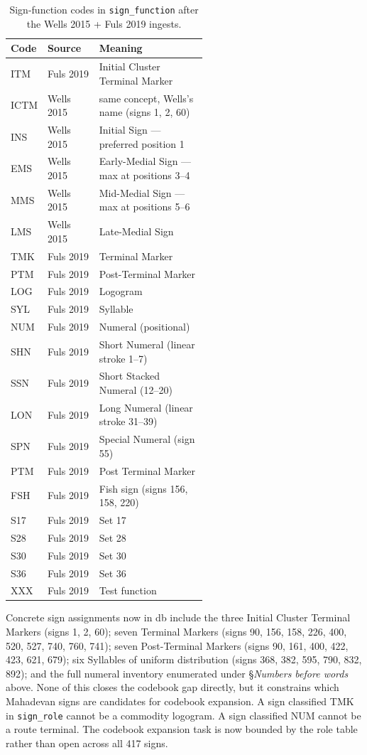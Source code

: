 \begin{longtable}{@{}llp{0.55\linewidth}@{}}
\caption{Sign-function codes in \texttt{sign\_function} after
the Wells 2015 + Fuls 2019 ingests.}
\label{tab:signfunctions}\\
\toprule
Code & Source & Meaning \\
\midrule
\endfirsthead
\bottomrule
\endlastfoot
ITM  & Fuls 2019 & Initial Cluster Terminal Marker \\
\midrule
ICTM & Wells 2015 & same concept, Wells's name (signs 1, 2, 60) \\
\midrule
INS  & Wells 2015 & Initial Sign --- preferred position 1 \\
\midrule
EMS  & Wells 2015 & Early-Medial Sign --- max at positions 3--4 \\
\midrule
MMS  & Wells 2015 & Mid-Medial Sign --- max at positions 5--6 \\
\midrule
LMS  & Wells 2015 & Late-Medial Sign \\
\midrule
TMK  & Fuls 2019 & Terminal Marker \\
\midrule
PTM  & Fuls 2019 & Post-Terminal Marker \\
\midrule
LOG  & Fuls 2019 & Logogram \\
\midrule
SYL  & Fuls 2019 & Syllable \\
\midrule
NUM  & Fuls 2019 & Numeral (positional) \\
\midrule
SHN  & Fuls 2019 & Short Numeral (linear stroke 1--7) \\
\midrule
SSN  & Fuls 2019 & Short Stacked Numeral (12--20) \\
\midrule
LON  & Fuls 2019 & Long Numeral (linear stroke 31--39) \\
\midrule
SPN  & Fuls 2019 & Special Numeral (sign 55) \\
\midrule
PTM  & Fuls 2019 & Post Terminal Marker \\
\midrule
FSH  & Fuls 2019 & Fish sign (signs 156, 158, 220) \\
\midrule
S17  & Fuls 2019 & Set 17 \\
\midrule
S28  & Fuls 2019 & Set 28 \\
\midrule
S30  & Fuls 2019 & Set 30 \\
\midrule
S36  & Fuls 2019 & Set 36 \\
\midrule
XXX  & Fuls 2019 & Test function \\
\end{longtable}

\noindent
Concrete sign assignments now in db include the three Initial Cluster
Terminal Markers (signs 1, 2, 60); seven Terminal Markers (signs 90,
156, 158, 226, 400, 520, 527, 740, 760, 741); seven Post-Terminal
Markers (signs 90, 161, 400, 422, 423, 621, 679); six Syllables of
uniform distribution (signs 368, 382, 595, 790, 832, 892); and the
full numeral inventory enumerated under §\textit{Numbers before
words} above. None of this closes the codebook gap directly, but it
constrains which Mahadevan signs are candidates for codebook
expansion. A sign classified TMK in \texttt{sign\_role} cannot be
a commodity logogram. A sign classified NUM cannot be a route
terminal. The codebook expansion task is now bounded by the role
table rather than open across all 417 signs.

